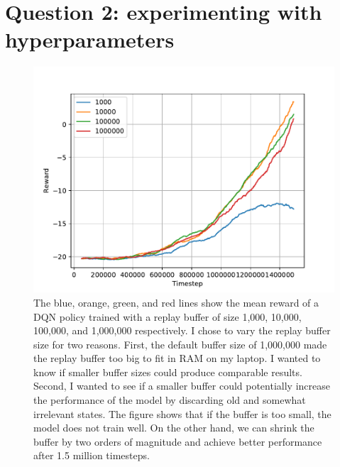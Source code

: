 \documentclass{mwhittaker}
\begin{document}
\section*{Question 2: experimenting with hyperparameters}
\begin{figure}[h]
  \centering
  \includegraphics[width=\textwidth]{q2.pdf}
  \caption{%
    The blue, orange, green, and red lines show the mean reward of a DQN policy
    trained with a replay buffer of size 1,000, 10,000, 100,000, and 1,000,000
    respectively. I chose to vary the replay buffer size for two reasons.
    First, the default buffer size of 1,000,000 made the replay buffer too big
    to fit in RAM on my laptop. I wanted to know if smaller buffer sizes could
    produce comparable results. Second, I wanted to see if a smaller buffer
    could potentially increase the performance of the model by discarding old
    and somewhat irrelevant states. The figure shows that if the buffer is too
    small, the model does not train well. On the other hand, we can shrink the
    buffer by two orders of magnitude and achieve better performance after 1.5
    million timesteps.
  }\label{fig:q2}
\end{figure}
\end{document}

